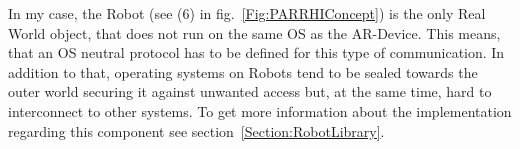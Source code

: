 In my case, the Robot (see (6) in fig.~\ref{Fig:PARRHIConcept}) is the only Real World object, that does not run on the same OS as the AR-Device. This means, that an OS neutral protocol has to be defined for this type of communication. In addition to that, operating systems on Robots tend to be sealed towards the outer world securing it against unwanted access but, at the same time, hard to interconnect to other systems. To get more information about the implementation regarding this component see section~\ref{Section:RobotLibrary}.


























